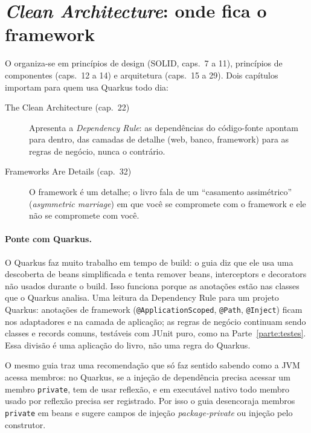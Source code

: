 \section{\emph{Clean Architecture}: onde fica o framework}

O  organiza-se em princípios de design
(SOLID, caps.~7 a 11), princípios de componentes (caps.~12 a 14) e
arquitetura (caps.~15 a 29). Dois capítulos importam para quem usa
Quarkus todo dia:

\begin{description}
\item[The Clean Architecture (cap.~22)] Apresenta a \emph{Dependency
  Rule}: as dependências do código-fonte apontam para dentro, das
  camadas de detalhe (web, banco, framework) para as regras de negócio,
  nunca o contrário.
\item[Frameworks Are Details (cap.~32)] O framework é um detalhe; o
  livro fala de um \enquote{casamento assimétrico} (\emph{asymmetric
  marriage}) em que você se compromete com o framework e ele não se
  compromete com você.
\end{description}

\paragraph{Ponte com Quarkus.}
O Quarkus faz muito trabalho em tempo de build: o guia
 diz que ele usa uma descoberta de
beans simplificada e tenta remover beans, interceptors e decorators não
usados durante o build. Isso funciona porque as anotações estão nas
classes que o Quarkus analisa. Uma leitura da Dependency Rule para um
projeto Quarkus: anotações de framework (\texttt{@ApplicationScoped},
\texttt{@Path}, \texttt{@Inject}) ficam nos adaptadores e na camada de
aplicação; as regras de negócio continuam sendo classes e records
comuns, testáveis com JUnit puro, como na Parte~\ref{parte:testes}. Essa divisão é
uma aplicação do livro, não uma regra do Quarkus.

O mesmo guia traz uma recomendação que só faz sentido sabendo como a JVM
acessa membros: no Quarkus, se a injeção de dependência precisa acessar
um membro \texttt{private}, tem de usar reflexão, e em executável nativo
todo membro usado por reflexão precisa ser registrado. Por isso o guia
desencoraja membros \texttt{private} em beans e sugere campos de
injeção \emph{package-private} ou injeção pelo construtor.
